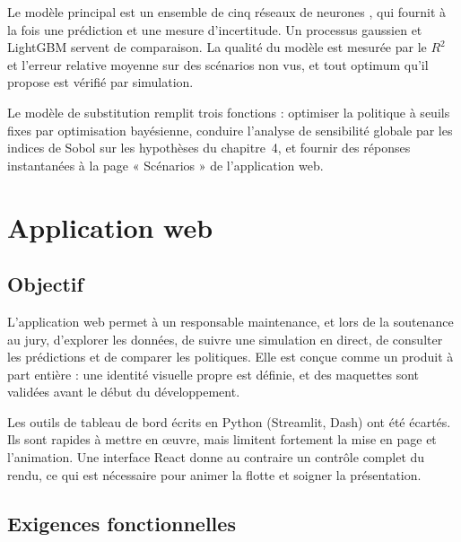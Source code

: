 \documentclass[11pt,a4paper]{article}
\begin{document}
Le modèle principal est un ensemble de cinq réseaux de neurones \cite{ensembles}, qui fournit à la fois une prédiction et une mesure d'incertitude. Un processus gaussien et LightGBM servent de comparaison. La qualité du modèle est mesurée par le $R^2$ et l'erreur relative moyenne sur des scénarios non vus, et tout optimum qu'il propose est vérifié par simulation.

Le modèle de substitution remplit trois fonctions : optimiser la politique à seuils fixes par optimisation bayésienne, conduire l'analyse de sensibilité globale par les indices de Sobol \cite{saltelli} sur les hypothèses du chapitre~4, et fournir des réponses instantanées à la page « Scénarios » de l'application web.

\section{Application web}\label{sec:web}

\subsection{Objectif}

L'application web permet à un responsable maintenance, et lors de la soutenance au jury, d'explorer les données, de suivre une simulation en direct, de consulter les prédictions et de comparer les politiques. Elle est conçue comme un produit à part entière : une identité visuelle propre est définie, et des maquettes sont validées avant le début du développement.

Les outils de tableau de bord écrits en Python (Streamlit, Dash) ont été écartés. Ils sont rapides à mettre en œuvre, mais limitent fortement la mise en page et l'animation. Une interface React donne au contraire un contrôle complet du rendu, ce qui est nécessaire pour animer la flotte et soigner la présentation.

\subsection{Exigences fonctionnelles}
\end{document}
